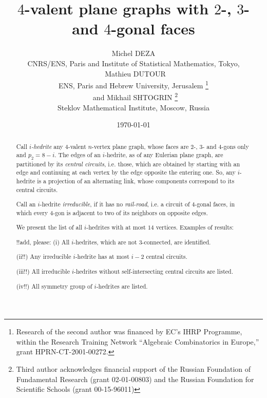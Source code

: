 \documentclass[12pt]{article}
\begin{document}
\title{$4$-valent plane graphs with $2$-, $3$- and $4$-gonal faces}


\author{Michel DEZA \\
  CNRS/ENS, Paris and Institute of Statistical Mathematics, 
Tokyo,\\
\ Mathieu DUTOUR \\
 ENS, Paris and Hebrew University, Jerusalem
\footnote{Research of the second author was financed by EC's IHRP Programme, within the Research Training Network ``Algebraic Combinatorics in Europe,'' grant HPRN-CT-2001-00272.}\\
\ and  Mikhail SHTOGRIN \thanks{Third author acknowledges financial support 
of the Russian Foundation of Fundamental Research (grant 02-01-00803)
and the Russian Foundation for Scientific Schools (grant 00-15-96011)}\\
Steklov Mathematical Institute, Moscow, Russia} 
\date{\today}

\maketitle



\begin{abstract}
Call {\em $i$-hedrite} any $4$-valent $n$-vertex plane graph, whose 
faces are $2$-, $3$- and $4$-gons only and $p_2=8-i$. The edges of an $i$-hedrite, as of 
any Eulerian plane graph, are partitioned
by its {\em central circuits}, i.e. those, which are obtained by starting with an
edge and continuing at each vertex by the edge opposite the entering one. 
So, any $i$-hedrite is a projection of an alternating link, whose components
correspond to its central circuits.

Call an $i$-hedrite {\em irreducible}, if it has no 
{\em rail-road}, i.e. a 
circuit of $4$-gonal faces, in which every $4$-gon is adjacent to two of its 
neighbors on opposite edges.

We present the list of all $i$-hedrites with at most $14$ vertices. Examples of results: 

!!add, please: (i) All $i$-hedrites, which are not $3$-connected, are 
identified.

(ii!!) Any irreducible $i$-hedrite has at most $i-2$ central circuits.

(iii!!) All irreducible $i$-hedrites without self-intersecting central circuits are listed.

(iv!!) All symmetry group of $i$-hedrites are listed.

\end{abstract}
\end{document}

